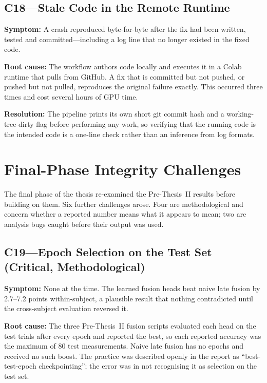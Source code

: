 \subsection*{C18---Stale Code in the Remote Runtime}

\textbf{Symptom:} A crash reproduced byte-for-byte after the fix had been written,
tested and committed---including a log line that no longer existed in the fixed code.

\textbf{Root cause:} The workflow authors code locally and executes it in a Colab
runtime that pulls from GitHub. A fix that is committed but not pushed, or pushed but
not pulled, reproduces the original failure exactly. This occurred three times and
cost several hours of GPU time.

\textbf{Resolution:} The pipeline prints its own short git commit hash and a
working-tree-dirty flag before performing any work, so verifying that the running code
is the intended code is a one-line check rather than an inference from log formats.

\section{Final-Phase Integrity Challenges}
\label{sec:p3_challenges}

The final phase of the thesis re-examined the Pre-Thesis~II results before building on
them. Six further challenges arose. Four are methodological and concern whether a
reported number means what it appears to mean; two are analysis bugs caught before
their output was used.

\subsection*{C19---Epoch Selection on the Test Set (Critical, Methodological)}

\textbf{Symptom:} None at the time. The learned fusion heads beat naive late fusion by
2.7--7.2 points within-subject, a plausible result that nothing contradicted until the
cross-subject evaluation reversed it.

\textbf{Root cause:} The three Pre-Thesis~II fusion scripts evaluated each head on the
test trials after every epoch and reported the best, so each reported accuracy was the
maximum of 80 test measurements. Naive late fusion has no epochs and received no such
boost. The practice was described openly in the report as ``best-test-epoch
checkpointing''; the error was in not recognising it as selection on the test set.

